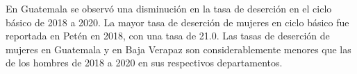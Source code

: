En Guatemala se observó una disminución en la tasa de deserción en el ciclo básico de 2018 a 2020. La mayor tasa de deserción de mujeres en ciclo básico fue reportada en Petén en 2018, con una tasa de 21.0. Las tasas de deserción de mujeres en Guatemala y en Baja Verapaz son considerablemente menores que las de los hombres de 2018 a 2020 en sus respectivos departamentos. 
